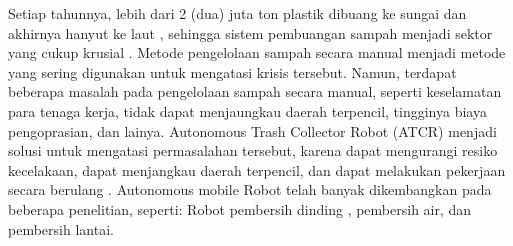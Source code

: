  
 
 
 
 
 
 
 
 Setiap tahunnya, lebih dari 2 (dua) juta ton plastik dibuang ke sungai dan akhirnya hanyut ke laut \cite{Othman2020}, 
 sehingga sistem pembuangan sampah menjadi sektor yang cukup krusial \cite{Othman2020}\cite{Hossain2019}. 
 Metode pengelolaan sampah secara manual menjadi metode yang sering digunakan untuk mengatasi krisis tersebut\cite{Khan2020}. 
 Namun, terdapat beberapa masalah pada pengelolaan sampah secara manual, seperti keselamatan para tenaga kerja, tidak dapat menjaungkau daerah terpencil, tingginya biaya pengoprasian, dan lainya\cite{Khan2020}. 
 Autonomous Trash Collector Robot (ATCR) menjadi solusi untuk mengatasi permasalahan tersebut, karena dapat mengurangi resiko kecelakaan, dapat menjangkau daerah terpencil, dan dapat melakukan pekerjaan secara berulang \cite{Khan2020, Bai2018}. Autonomous mobile Robot telah banyak dikembangkan pada beberapa penelitian, seperti: Robot pembersih dinding \cite{HouxiangZhang2006}, pembersih air\cite{Yuan2011}, dan pembersih lantai\cite{Bai2018, Kang2014, Palacin2004}. 
 
